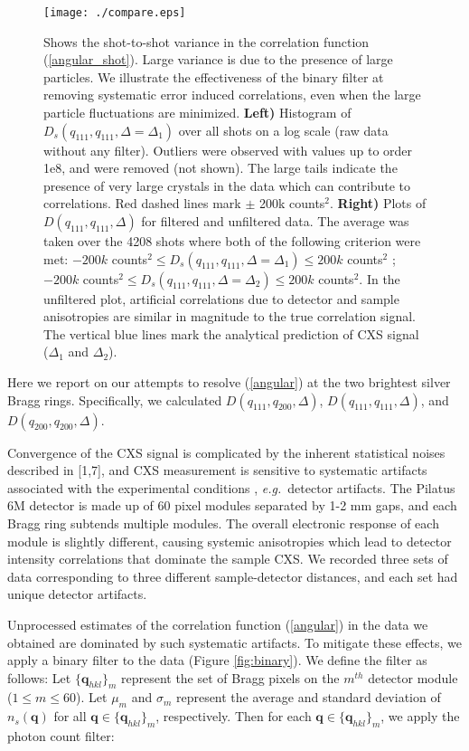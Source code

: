 \documentclass [11pt,fleqn]{article}
\begin{document}
\begin{figure}
\begin{center}
\texttt{[image: ./compare.eps]}
\end{center}
\caption{ Shows the shot-to-shot variance in the correlation function (\ref{angular_shot}). Large variance is due to the presence of large particles. We illustrate the effectiveness of the binary filter at removing systematic error induced correlations, even when the large particle fluctuations are minimized. {\bf Left)} Histogram of $D_s(q_{111}, q_{111}, \Delta = \Delta_1)$ over all shots on a log scale (raw data without any filter). Outliers were observed with values up to order 1e8, and were removed (not shown). The large tails indicate the presence of very large crystals in the data which can contribute to correlations. Red dashed lines mark $\pm$ 200k counts$^2$. {\bf Right)} Plots of $D(q_{111}, q_{111}, \Delta)$ for filtered and unfiltered data. The average was taken over the 4208 shots where both of the following criterion were met: $-200k $ counts$^2 \le D_s(q_{111}, q_{111}, \Delta = \Delta_1) \le 200k$ counts$^2$ ; $-200k $ counts$^2 \le D_s(q_{111}, q_{111}, \Delta = \Delta_2) \le 200k$ counts$^2$. In the unfiltered plot, artificial correlations due to detector and sample anisotropies are similar in magnitude to the true correlation signal. The vertical blue lines mark the analytical prediction of CXS signal ($\Delta_1$ and $\Delta_2$).}
\label{fig:compare}
\end{figure}

Here we report on our attempts to resolve (\ref{angular}) at the two brightest silver Bragg rings. Specifically, we calculated $D (q_{111},q_{200}, \Delta  )$, $D (q_{111},q_{111}, \Delta  )$, and $D (q_{200},q_{200}, \Delta  )$. 

Convergence of the CXS signal is complicated by the inherent statistical noises described in [1,7], and CXS measurement is sensitive to systematic artifacts associated with the experimental conditions \cite{Kam:1981ua}, \textit{e.g.}~detector artifacts. The Pilatus 6M detector is made up of 60 pixel modules separated by 1-2 mm gaps, and each Bragg ring subtends multiple modules. The overall electronic response of each module is slightly different, causing systemic anisotropies which lead to detector intensity correlations that dominate the sample CXS. We recorded three sets of data corresponding to three different sample-detector distances, and each set had unique detector artifacts. 

Unprocessed estimates of the correlation function (\ref{angular}) in the data we obtained are dominated by such systematic artifacts. To mitigate these effects, we apply a binary filter to the data (Figure \ref{fig:binary}). We define the filter as follows: Let $\{ \bm q_{hkl} \}_{m}$ represent the set of Bragg pixels on the $m^{th}$ detector module ($1 \leq m \leq 60$). Let $\mu_m$ and $\sigma_m$ represent the average and standard deviation of $n_{s}(\bm q)$  for all $\bm q \in \{ \bm q_{hkl} \}_{m} $, respectively. Then for each $\bm q \in \{ \bm q_{hkl} \}_{m} $, we apply the photon count filter:
\end{document}
